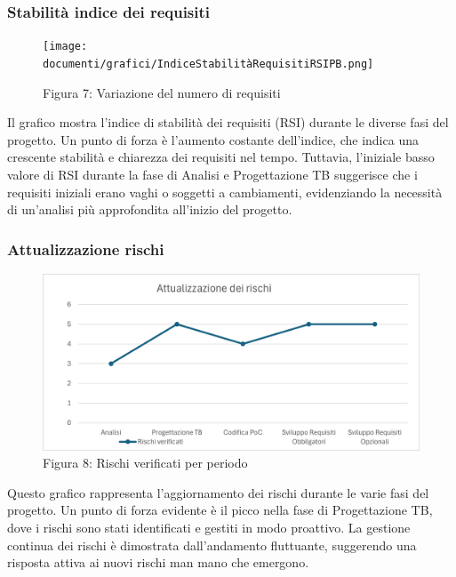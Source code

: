 \documentclass{article}
\begin{document}
\subsubsection{Stabilità indice dei requisiti}
\begin{figure}[H]
    \centering
    \texttt{[image: documenti/grafici/IndiceStabilitàRequisitiRSIPB.png]}
    \caption{Figura 7: Variazione del numero di requisiti}
    \end{figure}
     Il grafico mostra l'indice di stabilità dei requisiti (RSI) durante le diverse fasi del progetto. Un punto di forza è l'aumento costante dell'indice, che indica una crescente stabilità e chiarezza dei requisiti nel tempo. Tuttavia, l'iniziale basso valore di RSI durante la fase di Analisi e Progettazione TB suggerisce che i requisiti iniziali erano vaghi o soggetti a cambiamenti, evidenziando la necessità di un'analisi più approfondita all'inizio del progetto.
\subsubsection{Attualizzazione rischi}
\begin{figure}[H]
    \centering
    \includegraphics{documenti/grafici/AttualizzazioneDeiRischiPB1.png}
    \caption{Figura 8: Rischi verificati per periodo}
    \end{figure}
    Questo grafico rappresenta l'aggiornamento dei rischi durante le varie fasi del progetto. Un punto di forza evidente è il picco nella fase di Progettazione TB, dove i rischi sono stati identificati e gestiti in modo proattivo. La gestione continua dei rischi è dimostrata dall'andamento fluttuante, suggerendo una risposta attiva ai nuovi rischi man mano che emergono.
\end{document}
